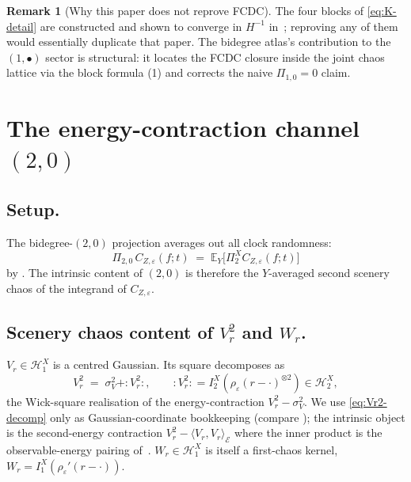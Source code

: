 \documentclass[11pt,reqno]{amsart}
\theoremstyle{plain}
\theoremstyle{definition}
\newtheorem{remark}[theorem]{Remark}
\theoremstyle{remark}
\newcommand{\E}{\mathbb{E}}
\newcommand{\Hilb}{\mathcal{H}}
\newcommand{\Energy}{\mathcal{E}}
\newcommand{\IBM}{Z}
\newcommand{\Pir}{\Pi}
\begin{document}
\begin{remark}[Why this paper does not reprove FCDC]
The four blocks of \eqref{eq:K-detail} are constructed and shown to
converge in $H^{-1}$ in~\cite{Fontes-FCDC}; reproving any of them
would essentially duplicate that paper. The bidegree atlas's
contribution to the $(1,\bullet)$ sector is structural: it locates
the FCDC closure inside the joint chaos lattice via the block
formula (1) and corrects the naive
$\Pir_{1,0}=0$ claim.
\end{remark}

\section{The energy-contraction channel \texorpdfstring{$(2,0)$}{(2,0)}}\label{sec:contraction}

\subsection*{Setup.}
The bidegree-$(2,0)$ projection averages out all clock randomness:
\begin{equation}\label{eq:2-0-collapse}
 \Pir_{2,0}\,C_{\IBM,\varepsilon}(f;t)
 \;=\;\E_Y\!\bigl[\Pir_2^X C_{\IBM,\varepsilon}(f;t)\bigr]
\end{equation}
by . The intrinsic content of $(2,0)$ is therefore
the $Y$-averaged second scenery chaos of the integrand of
$C_{\IBM,\varepsilon}$.

\subsection*{Scenery chaos content of \texorpdfstring{$V_r^2$}{V\_r\^{}2} and \texorpdfstring{$W_r$}{W\_r}.}
$V_r\in\Hilb_1^X$ is a centred Gaussian. Its square decomposes as
\begin{equation}\label{eq:Vr2-decomp}
 V_r^2\;=\;\sigma_V^2+{:}V_r^2{:},\qquad
 {:}V_r^2{:}=I_2^X(\rho_\varepsilon(r-\cdot)^{\otimes 2})\in\Hilb_2^X,
\end{equation}
the Wick-square realisation of the energy-contraction
$V_r^2-\sigma_V^2$. We use \eqref{eq:Vr2-decomp} only as
Gaussian-coordinate bookkeeping (compare ); the
intrinsic object is the second-energy contraction
$V_r^2-\langle V_r,V_r\rangle_{\Energy}$ where the inner product is
the observable-energy pairing of~\cite{Fontes-EnergyFirst}.
$W_r\in\Hilb_1^X$ is itself a first-chaos kernel,
$W_r=I_1^X(\rho_\varepsilon'(r-\cdot))$.
\end{document}

